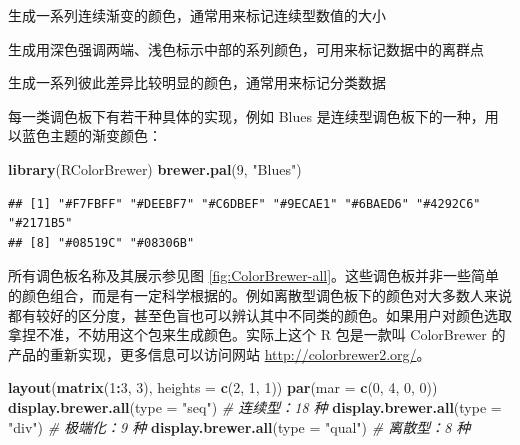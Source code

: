 \documentclass[
  b5paper,
  UTF8,twoside]{book}
\newenvironment{Shaded}{\begin{snugshade}}{\end{snugshade}}
\newcommand{\AttributeTok}[1]{\textcolor[rgb]{0.13,0.29,0.53}{#1}}
\newcommand{\CommentTok}[1]{\textcolor[rgb]{0.56,0.35,0.01}{\textit{#1}}}
\newcommand{\DecValTok}[1]{\textcolor[rgb]{0.00,0.00,0.81}{#1}}
\newcommand{\FunctionTok}[1]{\textcolor[rgb]{0.13,0.29,0.53}{\textbf{#1}}}
\newcommand{\NormalTok}[1]{#1}
\newcommand{\SpecialCharTok}[1]{\textcolor[rgb]{0.81,0.36,0.00}{\textbf{#1}}}
\newcommand{\StringTok}[1]{\textcolor[rgb]{0.31,0.60,0.02}{#1}}
\providecommand{\tightlist}{%
  \setlength{\itemsep}{0pt}\setlength{\parskip}{0pt}}
\begin{document}
\begin{description}
\tightlist
\item[连续型调色板 Sequential palettes]
生成一系列连续渐变的颜色，通常用来标记连续型数值的大小
\item[极端化调色板 Diverging palettes]
生成用深色强调两端、浅色标示中部的系列颜色，可用来标记数据中的离群点
\item[离散型调色板 Qualitative palettes]
生成一系列彼此差异比较明显的颜色，通常用来标记分类数据
\end{description}

每一类调色板下有若干种具体的实现，例如 Blues 是连续型调色板下的一种，用以蓝色主题的渐变颜色：

\begin{Shaded}
\begin{Highlighting}[]
\FunctionTok{library}\NormalTok{(RColorBrewer)}
\FunctionTok{brewer.pal}\NormalTok{(}\DecValTok{9}\NormalTok{, }\StringTok{"Blues"}\NormalTok{)}
\end{Highlighting}
\end{Shaded}

\begin{verbatim}
## [1] "#F7FBFF" "#DEEBF7" "#C6DBEF" "#9ECAE1" "#6BAED6" "#4292C6" "#2171B5"
## [8] "#08519C" "#08306B"
\end{verbatim}

所有调色板名称及其展示参见图 \ref{fig:ColorBrewer-all}。这些调色板并非一些简单的颜色组合，而是有一定科学根据的。例如离散型调色板下的颜色对大多数人来说都有较好的区分度，甚至色盲也可以辨认其中不同类的颜色。如果用户对颜色选取拿捏不准，不妨用这个包来生成颜色。实际上这个 R 包是一款叫 ColorBrewer 的产品的重新实现，更多信息可以访问网站 \url{http://colorbrewer2.org/}。

\begin{Shaded}
\begin{Highlighting}[]
\FunctionTok{layout}\NormalTok{(}\FunctionTok{matrix}\NormalTok{(}\DecValTok{1}\SpecialCharTok{:}\DecValTok{3}\NormalTok{, }\DecValTok{3}\NormalTok{), }\AttributeTok{heights =} \FunctionTok{c}\NormalTok{(}\DecValTok{2}\NormalTok{, }\DecValTok{1}\NormalTok{, }\DecValTok{1}\NormalTok{))}
\FunctionTok{par}\NormalTok{(}\AttributeTok{mar =} \FunctionTok{c}\NormalTok{(}\DecValTok{0}\NormalTok{, }\DecValTok{4}\NormalTok{, }\DecValTok{0}\NormalTok{, }\DecValTok{0}\NormalTok{))}
\FunctionTok{display.brewer.all}\NormalTok{(}\AttributeTok{type =} \StringTok{"seq"}\NormalTok{) }\CommentTok{\# 连续型：18 种}
\FunctionTok{display.brewer.all}\NormalTok{(}\AttributeTok{type =} \StringTok{"div"}\NormalTok{) }\CommentTok{\# 极端化：9 种}
\FunctionTok{display.brewer.all}\NormalTok{(}\AttributeTok{type =} \StringTok{"qual"}\NormalTok{) }\CommentTok{\# 离散型：8 种}
\end{Highlighting}
\end{Shaded}
\end{document}
